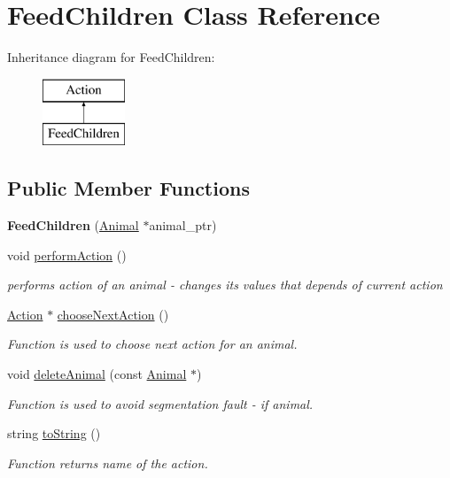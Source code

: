 \hypertarget{class_feed_children}{}\section{Feed\+Children Class Reference}
\label{class_feed_children}
Inheritance diagram for Feed\+Children\+:\begin{figure}[H]
\begin{center}
\leavevmode
\includegraphics[height=2.000000cm]{class_feed_children}
\end{center}
\end{figure}
\subsection*{Public Member Functions}
\begin{DoxyCompactItemize}
\item 
\hypertarget{class_feed_children_aeb47c04ff7ded91a840c3c1057a5a820}{}{\bfseries Feed\+Children} (\hyperlink{class_animal}{Animal} $\ast$animal\+\_\+ptr)\label{class_feed_children_aeb47c04ff7ded91a840c3c1057a5a820}

\item 
void \hyperlink{class_feed_children_a1bd88e57f553954f1eda70b7a38b1c92}{perform\+Action} ()
\begin{DoxyCompactList}\small\item\em performs action of an animal -\/ changes it\textquotesingle{}s values that depends of current action \end{DoxyCompactList}\item 
\hyperlink{class_action}{Action} $\ast$ \hyperlink{class_feed_children_a22a9852c7ca1c0f0016872800b9f993a}{choose\+Next\+Action} ()
\begin{DoxyCompactList}\small\item\em Function is used to choose next action for an animal. \end{DoxyCompactList}\item 
void \hyperlink{class_feed_children_a06823808a9e61b52f6e0cbccf360a93f}{delete\+Animal} (const \hyperlink{class_animal}{Animal} $\ast$)
\begin{DoxyCompactList}\small\item\em Function is used to avoid segmentation fault -\/ if animal. \end{DoxyCompactList}\item 
string \hyperlink{class_feed_children_a2835ed51028709e527a343af495db85b}{to\+String} ()
\begin{DoxyCompactList}\small\item\em Function returns name of the action. \end{DoxyCompactList}\end{DoxyCompactItemize}
